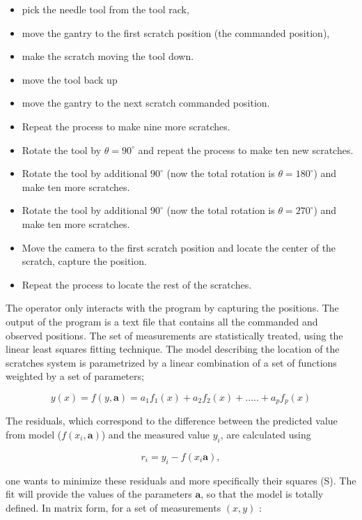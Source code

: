 \begin{itemize}
\item pick the needle tool from the tool rack,
\item move the gantry to the first scratch position (the commanded position),
\item make the scratch moving the tool down.
\item move the tool back up
\item move the gantry to the next scratch commanded position.
\item Repeat the process to make nine more scratches.
\item Rotate the tool by $\theta=90^\circ$ and repeat the process to make ten new scratches.
\item Rotate the tool by additional $90^\circ$ (now the total rotation is $\theta=180^\circ$) and make ten more scratches.
\item Rotate the tool by additional $90^\circ$ (now the total rotation is $\theta=270^\circ$) and make ten more scratches.
\item Move the camera to the first scratch position and locate the center of the scratch, capture the position.
\item Repeat the process to locate the rest of the scratches.   
\end{itemize}

The operator only interacts with the program by capturing the positions. The output of the program is a text file that contains all the commanded and observed positions. The set of measurements are statistically treated, using the linear least squares fitting technique. The model describing the location of the scratches system is parametrized by a linear combination of a set of functions weighted by a set of parameters;

\begin{equation}
y(x)= f(y,\textbf{a})=a_1f_1(x)+a_2f_2(x)+.....+a_pf_p(x)
\end{equation}

The residuals, which correspond to the difference between the predicted value from model ($f(x_i, \textbf{a})$) and the measured value $y_i$, are calculated using 

\begin{equation}
r_i= y_i - f(x_i\textbf{a}),
\end{equation}

\noindent one wants to minimize these residuals and more specifically their squares (S). The fit will provide the values of the parameters $\textbf{a}$, so that the model is totally defined. In matrix form, for a set of measurements $(x,y)$ :

